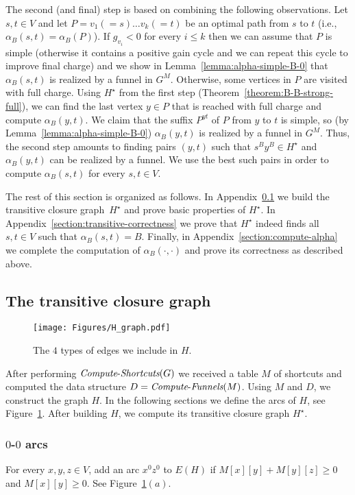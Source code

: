 \documentclass[11pt]{article}
\newcommand{\ComputeF}{\mbox{{\it Compute}-{\it Funnels}}}
\newcommand{\ComputeS}{\mbox{{\it Compute}-{\it Shortcuts}}}
\begin{document}
The second (and final) step is based on combining the following observations. Let $s,t \in V$ and let $P= v_1 (=s) \ldots v_k(=t)$ be an optimal path  from $s$ to $t$ (i.e., $\alpha_B(s,t)=\alpha_B(P)$). If $g_{v_i} < 0$ for every $i\le k$ then we can assume that $P$ is simple (otherwise it contains a positive gain cycle and we can repeat this cycle to improve final charge) and we show in Lemma~\ref{lemma:alpha-simple-B-0} that $\alpha_B(s,t)$ is realized by a funnel in $G^M$. Otherwise, some vertices in $P$ are visited with full charge. Using $H^\star$ from the first step (Theorem~\ref{theorem:B-B-strong-full}), we can find the last vertex $y\in P$ that is reached with full charge and compute $\alpha_B(y,t)$. We claim that the suffix $P^{yt}$ of $P$ from $y$ to $t$ is simple, so (by Lemma~\ref{lemma:alpha-simple-B-0})  $\alpha_B(y,t)$ is realized by a funnel in $G^M$. Thus, the second step amounts to finding pairs $(y,t)$ such that $s^B y^B \in H^\star$ and $\alpha_B(y,t)$ can be realized by a funnel. We use the best such pairs in order to compute $\alpha_B(s,t)$ for every $s,t\in V$.   

The rest of this section is organized as follows. In Appendix~\ref{section:transitive-graph} we build the transitive closure graph~$H^\star$ and prove basic properties of $H^\star$. In Appendix~\ref{section:transitive-correctness} we prove that $H^\star$ indeed finds all $s,t\in V$ such that $\alpha_B(s,t)=B$. Finally, in Appendix~\ref{section:compute-alpha} we complete the computation of $\alpha_B(\cdot,\cdot)$ and prove its correctness as described above. 

\subsection{The transitive closure graph}\label{section:transitive-graph}

\begin{figure}
    \centering
\texttt{[image: Figures/H\_graph.pdf]}
\caption{The $4$ types of edges we include in $H$.}
\label{fig:H}
\end{figure}

After performing $\ComputeS(G)$ we received a table $M$ of shortcuts and computed the data structure $D=\ComputeF(M)$. Using $M$ and $D$, we construct the graph $H$. 
In the following sections we define the arcs of $H$, see Figure~\ref{fig:H}. After building $H$, we compute its transitive closure graph $H^\star$.

\subsubsection{\texorpdfstring{$0$-$0$}{0-0} arcs}
For every $x,y,z \in V$, add an arc $x^0 z^0$ to $E(H)$ if $M[x][y]+M[y][z]\ge 0$ and $M[x][y]\ge 0$. See Figure~\ref{fig:H}$(a)$.
\end{document}
